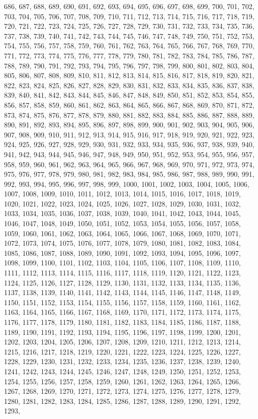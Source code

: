 \documentclass{article}
\begin{document}
{686, 687, 688, 689, 690, 691, 692, 693, 694, 695, 696, 697, 698, 699, 700, 701, 702, 703, 704, 705, 706, 707, 708, 709, 710, 711, 712, 713, 714, 715, 716, 717, 718, 719, 720, 721, 722, 723, 724, 725, 726, 727, 728, 729, 730, 731, 732, 733, 734, 735, 736, 737, 738, 739, 740, 741, 742, 743, 744, 745, 746, 747, 748, 749, 750, 751, 752, 753, 754, 755, 756, 757, 758, 759, 760, 761, 762, 763, 764, 765, 766, 767, 768, 769, 770, 771, 772, 773, 774, 775, 776, 777, 778, 779, 780, 781, 782, 783, 784, 785, 786, 787, 788, 789, 790, 791, 792, 793, 794, 795, 796, 797, 798, 799, 800, 801, 802, 803, 804, 805, 806, 807, 808, 809, 810, 811, 812, 813, 814, 815, 816, 817, 818, 819, 820, 821, 822, 823, 824, 825, 826, 827, 828, 829, 830, 831, 832, 833, 834, 835, 836, 837, 838, 839, 840, 841, 842, 843, 844, 845, 846, 847, 848, 849, 850, 851, 852, 853, 854, 855, 856, 857, 858, 859, 860, 861, 862, 863, 864, 865, 866, 867, 868, 869, 870, 871, 872, 873, 874, 875, 876, 877, 878, 879, 880, 881, 882, 883, 884, 885, 886, 887, 888, 889, 890, 891, 892, 893, 894, 895, 896, 897, 898, 899, 900, 901, 902, 903, 904, 905, 906, 907, 908, 909, 910, 911, 912, 913, 914, 915, 916, 917, 918, 919, 920, 921, 922, 923, 924, 925, 926, 927, 928, 929, 930, 931, 932, 933, 934, 935, 936, 937, 938, 939, 940, 941, 942, 943, 944, 945, 946, 947, 948, 949, 950, 951, 952, 953, 954, 955, 956, 957, 958, 959, 960, 961, 962, 963, 964, 965, 966, 967, 968, 969, 970, 971, 972, 973, 974, 975, 976, 977, 978, 979, 980, 981, 982, 983, 984, 985, 986, 987, 988, 989, 990, 991, 992, 993, 994, 995, 996, 997, 998, 999, 1000, 1001, 1002, 1003, 1004, 1005, 1006, 1007, 1008, 1009, 1010, 1011, 1012, 1013, 1014, 1015, 1016, 1017, 1018, 1019, 1020, 1021, 1022, 1023, 1024, 1025, 1026, 1027, 1028, 1029, 1030, 1031, 1032, 1033, 1034, 1035, 1036, 1037, 1038, 1039, 1040, 1041, 1042, 1043, 1044, 1045, 1046, 1047, 1048, 1049, 1050, 1051, 1052, 1053, 1054, 1055, 1056, 1057, 1058, 1059, 1060, 1061, 1062, 1063, 1064, 1065, 1066, 1067, 1068, 1069, 1070, 1071, 1072, 1073, 1074, 1075, 1076, 1077, 1078, 1079, 1080, 1081, 1082, 1083, 1084, 1085, 1086, 1087, 1088, 1089, 1090, 1091, 1092, 1093, 1094, 1095, 1096, 1097, 1098, 1099, 1100, 1101, 1102, 1103, 1104, 1105, 1106, 1107, 1108, 1109, 1110, 1111, 1112, 1113, 1114, 1115, 1116, 1117, 1118, 1119, 1120, 1121, 1122, 1123, 1124, 1125, 1126, 1127, 1128, 1129, 1130, 1131, 1132, 1133, 1134, 1135, 1136, 1137, 1138, 1139, 1140, 1141, 1142, 1143, 1144, 1145, 1146, 1147, 1148, 1149, 1150, 1151, 1152, 1153, 1154, 1155, 1156, 1157, 1158, 1159, 1160, 1161, 1162, 1163, 1164, 1165, 1166, 1167, 1168, 1169, 1170, 1171, 1172, 1173, 1174, 1175, 1176, 1177, 1178, 1179, 1180, 1181, 1182, 1183, 1184, 1185, 1186, 1187, 1188, 1189, 1190, 1191, 1192, 1193, 1194, 1195, 1196, 1197, 1198, 1199, 1200, 1201, 1202, 1203, 1204, 1205, 1206, 1207, 1208, 1209, 1210, 1211, 1212, 1213, 1214, 1215, 1216, 1217, 1218, 1219, 1220, 1221, 1222, 1223, 1224, 1225, 1226, 1227, 1228, 1229, 1230, 1231, 1232, 1233, 1234, 1235, 1236, 1237, 1238, 1239, 1240, 1241, 1242, 1243, 1244, 1245, 1246, 1247, 1248, 1249, 1250, 1251, 1252, 1253, 1254, 1255, 1256, 1257, 1258, 1259, 1260, 1261, 1262, 1263, 1264, 1265, 1266, 1267, 1268, 1269, 1270, 1271, 1272, 1273, 1274, 1275, 1276, 1277, 1278, 1279, 1280, 1281, 1282, 1283, 1284, 1285, 1286, 1287, 1288, 1289, 1290, 1291, 1292, 1293, }
\end{document}
